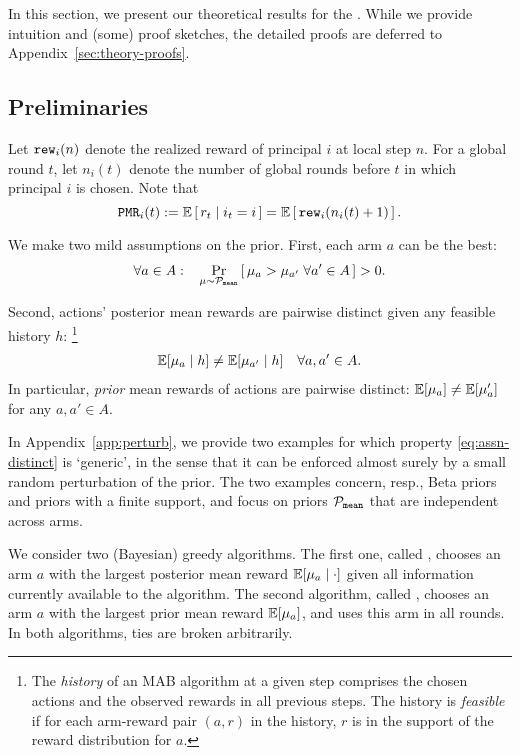 
In this section, we present our theoretical results for the \TheoryModel. While we provide intuition and (some) proof sketches, the detailed proofs are deferred to Appendix~\ref{sec:theory-proofs}.

\subsection{Preliminaries}
\label{sec:theory-prelims}

 Let $\mathtt{rew}_i(n)$ denote the realized reward of principal $i$ at local step $n$. For a global round $t$, let $n_i(t)$ denote the number of global rounds before $t$ in which principal $i$ is chosen. Note that
    \[ \PMR_i(t):=  \E\sbr{ r_t\mid i_t = i }
        = \E\sbr{ \rew_i(n_i(t)+1) }. \]

 We make two mild assumptions on the prior. First, each arm $a$ can be the best:
\begin{align}\label{eq:assn-prob}
\forall a\in A:\;\;\;
\Pr_{\mu\sim \mathcal{P}_\mathtt{mean}}\left[\,\mu_a  > \mu_{a'}
\;\forall a'\in A\,\right]
> 0.
\end{align}

\noindent Second, actions' posterior mean rewards are pairwise distinct given any feasible history $h$:%
\footnote{The \emph{history} of an MAB algorithm at a given step
  comprises the chosen actions and the observed rewards in all
  previous steps. The history is \emph{feasible} if for each arm-reward pair $(a,r)$ in the history, $r$ is in the support of the reward distribution for $a$.}
\begin{align}\label{eq:assn-distinct}
    \E[\mu_a \mid h] \neq \E[\mu_{a'}\mid h] \quad \forall a,a'\in A.
\end{align}
In particular, \emph{prior} mean rewards of actions are pairwise distinct:
$\E[\mu_a] \neq \E[\mu_a']$ for any $a,a'\in A$.

In Appendix~\ref{app:perturb}, we provide two examples for which property \eqref{eq:assn-distinct} is `generic', in the sense that it can be enforced almost surely by a small random perturbation of the prior. The two examples concern, resp., Beta priors and priors with a finite support, and focus on priors $\mathcal{P}_\mathtt{mean}$ that are independent across arms.

We consider two (Bayesian) greedy algorithms. The first one, called  \DynGreedy, chooses an arm $a$ with the largest posterior mean reward $\E[\mu_a \mid \cdot ]$ given all information currently available to the algorithm. The second algorithm, called \StaticGreedy, chooses an arm $a$ with the largest prior mean reward $\E[\mu_a]$, and uses this arm in all rounds. In both algorithms, ties are broken arbitrarily.


